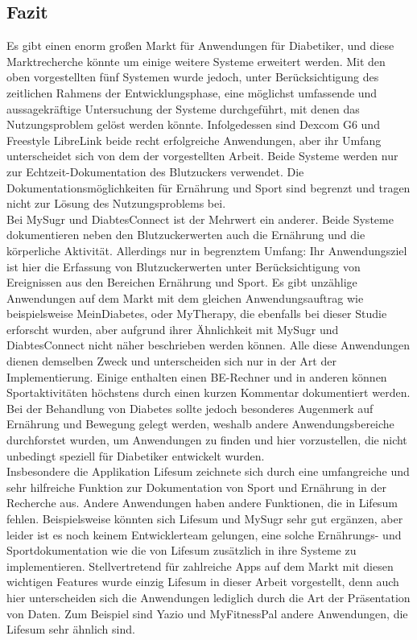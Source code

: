 	\subsection{Fazit}
	Es gibt einen enorm großen Markt für Anwendungen für Diabetiker, und diese Marktrecherche könnte um einige weitere Systeme erweitert werden. Mit den oben vorgestellten fünf Systemen wurde jedoch, unter Berücksichtigung des zeitlichen Rahmens der Entwicklungsphase, eine möglichst umfassende und aussagekräftige Untersuchung der Systeme durchgeführt, mit denen das Nutzungsproblem gelöst werden könnte. Infolgedessen sind Dexcom G6 und Freestyle LibreLink beide recht erfolgreiche Anwendungen, aber ihr Umfang unterscheidet sich von dem der vorgestellten Arbeit. Beide Systeme werden nur zur Echtzeit-Dokumentation des Blutzuckers verwendet. Die Dokumentationsmöglichkeiten für Ernährung und Sport sind begrenzt und tragen nicht zur Lösung des Nutzungsproblems bei.\\
	Bei MySugr und DiabtesConnect ist der Mehrwert ein anderer. Beide Systeme dokumentieren neben den Blutzuckerwerten auch die Ernährung und die körperliche Aktivität. Allerdings nur in begrenztem Umfang: Ihr Anwendungsziel ist hier die Erfassung von Blutzuckerwerten unter Berücksichtigung von Ereignissen aus den Bereichen Ernährung und Sport. Es gibt unzählige Anwendungen auf dem Markt mit dem gleichen Anwendungsauftrag wie beispielsweise MeinDiabetes, oder MyTherapy, die ebenfalls bei dieser Studie erforscht wurden, aber aufgrund ihrer Ähnlichkeit mit MySugr und DiabtesConnect nicht näher beschrieben werden können. Alle diese Anwendungen dienen demselben Zweck und unterscheiden sich nur in der Art der Implementierung. Einige enthalten einen BE-Rechner und in anderen können Sportaktivitäten höchstens durch einen kurzen Kommentar dokumentiert werden. Bei der Behandlung von Diabetes sollte jedoch besonderes Augenmerk auf Ernährung und Bewegung gelegt werden, weshalb andere Anwendungsbereiche durchforstet wurden, um Anwendungen zu finden und hier vorzustellen, die nicht unbedingt speziell für Diabetiker entwickelt wurden.\\
	Insbesondere die Applikation Lifesum zeichnete sich durch eine umfangreiche und sehr hilfreiche Funktion zur Dokumentation von Sport und Ernährung in der Recherche aus. Andere Anwendungen haben andere Funktionen, die in Lifesum fehlen. Beispielsweise könnten sich Lifesum und MySugr sehr gut ergänzen, aber leider ist es noch keinem Entwicklerteam gelungen, eine solche Ernährungs- und Sportdokumentation wie die von Lifesum zusätzlich in ihre Systeme zu implementieren. Stellvertretend für zahlreiche Apps auf dem Markt mit diesen wichtigen Features wurde einzig Lifesum in dieser Arbeit vorgestellt, denn auch hier unterscheiden sich die Anwendungen lediglich durch die Art der Präsentation von Daten. Zum Beispiel sind Yazio und MyFitnessPal andere Anwendungen, die Lifesum sehr ähnlich sind.\\
